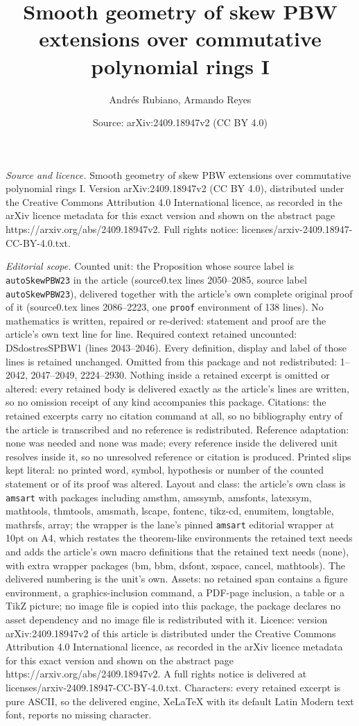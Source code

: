 \documentclass[10pt,a4paper]{amsart}
\title[Smooth geometry of skew PBW extensions over commutative poly]{Smooth geometry of skew PBW extensions over commutative polynomial rings I}
\author{Andr\'es Rubiano, Armando Reyes}
\date{Source: arXiv:2409.18947v2 (CC BY 4.0)}
\begin{document}
\maketitle

\noindent\emph{Source and licence.} Smooth geometry of skew PBW extensions over commutative polynomial rings I. Version arXiv:2409.18947v2 (CC BY 4.0), distributed under the Creative Commons Attribution 4.0 International licence, as recorded in the arXiv licence metadata for this exact version and shown on the abstract page https://arxiv.org/abs/2409.18947v2. Full rights notice: licenses/arxiv-2409.18947-CC-BY-4.0.txt.\par\smallskip

\noindent\textit{Editorial scope.} Counted unit: the Proposition whose source label is \texttt{autoSkewPBW23} in the article (source0.tex lines 2050--2085, source label \texttt{autoSkewPBW23}), delivered together with the article's own complete original proof of it (source0.tex lines 2086--2223, one \texttt{proof} environment of 138 lines). No mathematics is written, repaired or re-derived: statement and proof are the article's own text line for line. Required context retained uncounted: DSdostresSPBW1 (lines 2043--2046). Every definition, display and label of those lines is retained unchanged. Omitted from this package and not redistributed: 1--2042, 2047--2049, 2224--2930. Nothing inside a retained excerpt is omitted or altered: every retained body is delivered exactly as the article's lines are written, so no omission receipt of any kind accompanies this package. Citations: the retained excerpts carry no citation command at all, so no bibliography entry of the article is transcribed and no reference is redistributed. Reference adaptation: none was needed and none was made; every reference inside the delivered unit resolves inside it, so no unresolved reference or citation is produced. Printed slips kept literal: no printed word, symbol, hypothesis or number of the counted statement or of its proof was altered. Layout and class: the article's own class is \texttt{amsart} with packages including amsthm, amssymb, amsfonts, latexsym, mathtools, thmtools, amsmath, lscape, fontenc, tikz-cd, enumitem, longtable, mathrsfs, array; the wrapper is the lane's pinned \texttt{amsart} editorial wrapper at 10pt on A4, which restates the theorem-like environments the retained text needs and adds the article's own macro definitions that the retained text needs (none), with extra wrapper packages (bm, bbm, dsfont, xspace, cancel, mathtools). The delivered numbering is the unit's own. Assets: no retained span contains a figure environment, a graphics-inclusion command, a PDF-page inclusion, a table or a TikZ picture; no image file is copied into this package, the package declares no asset dependency and no image file is redistributed with it. Licence: version arXiv:2409.18947v2 of this article is distributed under the Creative Commons Attribution 4.0 International licence, as recorded in the arXiv licence metadata for this exact version and shown on the abstract page https://arxiv.org/abs/2409.18947v2. A full rights notice is delivered at licenses/arxiv-2409.18947-CC-BY-4.0.txt. Characters: every retained excerpt is pure ASCII, so the delivered engine, XeLaTeX with its default Latin Modern text font, reports no missing character.
\end{document}
